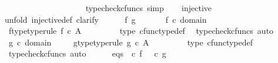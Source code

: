 \begin{isabellebody}
\ \ \ \ \ \ \ \ \ \ \ \ \ \ \ \ \ \ \isamarkupfalse%
\ {\isacharparenleft}{\kern0pt}typecheck{\isacharunderscore}{\kern0pt}cfuncs{\isacharcomma}{\kern0pt}\ simp{\isacharparenright}{\kern0pt}\isanewline
\ \ \isamarkupfalse%
\ {\isachardoublequoteopen}injective\ {\isasymphi}{\isachardoublequoteclose}\isanewline
\ \ \isamarkupfalse%
{\isacharparenleft}{\kern0pt}unfold\ injective{\isacharunderscore}{\kern0pt}def{\isacharcomma}{\kern0pt}\ clarify{\isacharparenright}{\kern0pt}\isanewline
\ \ \ \ \isamarkupfalse%
\ f\ g\ \isanewline
\ \ \ \ \isamarkupfalse%
\ {\isachardoublequoteopen}f\ {\isasymin}\isactrlsub c\ domain\ {\isasymphi}{\isachardoublequoteclose}\ \isamarkupfalse%
\ \isamarkupfalse%
\ f{\isacharunderscore}{\kern0pt}type{\isacharbrackleft}{\kern0pt}type{\isacharunderscore}{\kern0pt}rule{\isacharbrackright}{\kern0pt}{\isacharcolon}{\kern0pt}\ {\isachardoublequoteopen}f\ {\isasymin}\isactrlsub c\ A\isactrlbsup {\isasymOmega}\isactrlesup {\isachardoublequoteclose}\ \isanewline
\ \ \ \ \ \ \isamarkupfalse%
\ {\isasymphi}{\isacharunderscore}{\kern0pt}type\ cfunc{\isacharunderscore}{\kern0pt}type{\isacharunderscore}{\kern0pt}def\ \isamarkupfalse%
\ {\isacharparenleft}{\kern0pt}typecheck{\isacharunderscore}{\kern0pt}cfuncs{\isacharcomma}{\kern0pt}\ auto{\isacharparenright}{\kern0pt}\isanewline
\ \ \ \ \isamarkupfalse%
\ {\isachardoublequoteopen}g\ {\isasymin}\isactrlsub c\ domain\ {\isasymphi}{\isachardoublequoteclose}\ \isamarkupfalse%
\ \isamarkupfalse%
\ g{\isacharunderscore}{\kern0pt}type{\isacharbrackleft}{\kern0pt}type{\isacharunderscore}{\kern0pt}rule{\isacharbrackright}{\kern0pt}{\isacharcolon}{\kern0pt}\ {\isachardoublequoteopen}g\ {\isasymin}\isactrlsub c\ A\isactrlbsup {\isasymOmega}\isactrlesup {\isachardoublequoteclose}\ \isanewline
\ \ \ \ \ \ \isamarkupfalse%
\ {\isasymphi}{\isacharunderscore}{\kern0pt}type\ cfunc{\isacharunderscore}{\kern0pt}type{\isacharunderscore}{\kern0pt}def\ \isamarkupfalse%
\ {\isacharparenleft}{\kern0pt}typecheck{\isacharunderscore}{\kern0pt}cfuncs{\isacharcomma}{\kern0pt}\ auto{\isacharparenright}{\kern0pt}\isanewline
\ \ \ \ \isamarkupfalse%
\ eqs{\isacharcolon}{\kern0pt}\ {\isachardoublequoteopen}{\isasymphi}\ {\isasymcirc}\isactrlsub c\ f\ {\isacharequal}{\kern0pt}\ {\isasymphi}\ {\isasymcirc}\isactrlsub c\ g{\isachardoublequoteclose}\isanewline
\ \ \ \ \isamarkupfalse%

\end{isabellebody}
